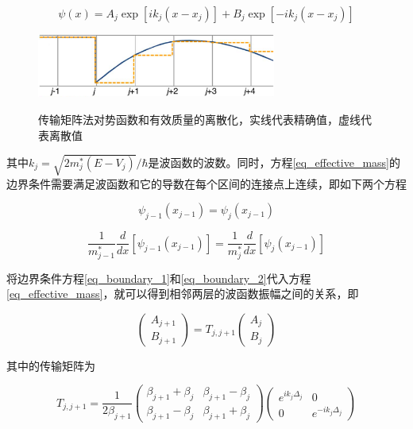 \documentclass[oneside]{ZJUthesis}
\begin{document}
\begin{equation}
    \label{eq_effective_mass_solution}
    \psi(x) = A_j \exp [i k_j (x-x_j)] + B_j \exp [-i k_j (x-x_j)]
\end{equation}

\begin{figure}[!h]
  \centering
  \includegraphics[width=0.7\textwidth]{./Pictures/tmm.eps}\\
  \caption{传输矩阵法对势函数和有效质量的离散化，实线代表精确值，虚线代表离散值}
  \label{fig_tmm}
\end{figure}

其中$k_j=\sqrt{2 m^*_j (E-V_j)} / \hbar$是波函数的波数。同时，方程\ref{eq_effective_mass}的边界条件需要满足波函数和它的导数在每个区间的连接点上连续，即如下两个方程

\begin{equation}
    \label{eq_boundary_1}
    \psi_{j-1}(x_{j-1}) = \psi_j(x_{j-1}) 
\end{equation}

\begin{equation}
    \label{eq_boundary_2}
    \frac{1}{m^*_{j-1}} \frac{d}{dx} [ \psi_{j-1}(x_{j-1}) ] = \frac{1}{m^*_j} \frac{d}{dx} [\psi_j(x_{j-1})]
\end{equation}

将边界条件方程\ref{eq_boundary_1}和\ref{eq_boundary_2}代入方程\ref{eq_effective_mass}，就可以得到相邻两层的波函数振幅之间的关系，即

\begin{equation}
    \label{eq_tmm}
    \begin{pmatrix} A_{j+1} \\ B_{j+1} \end{pmatrix} = T_{j,j+1} \begin{pmatrix} A_{j} \\ B_{j} \end{pmatrix}
\end{equation}

其中的传输矩阵为

\begin{equation}
    \label{eq_transfer_matrix}
    T_{j,j+1} = \frac{1}{2\beta_{j+1}} \begin{pmatrix} \beta_{j+1}+\beta_j & \beta_{j+1}-\beta_j  \\ \beta_{j+1}-\beta_j  & \beta_{j+1}+\beta_j  \end{pmatrix} \begin{pmatrix} e^{ik_j\Delta_j} & 0 \\ 0 & e^{-ik_j\Delta_j} \end{pmatrix}
\end{equation}
\end{document}
